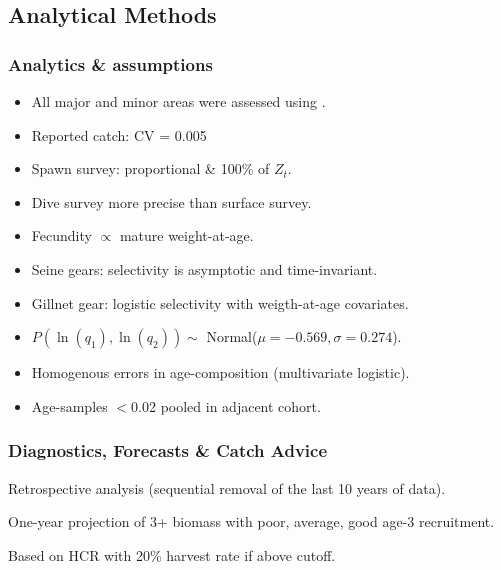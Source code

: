 \subsection{Analytical Methods} %
\label{sub:analytical_methods}
\begin{frame}[t]\frametitle{Analytics \& assumptions}
	\begin{itemize}
		\item<+-> All major and minor areas were assessed using  \iscam.
		\item<+-> Reported catch: CV = 0.005
		\item<+-> Spawn survey: proportional \& 100\% of $Z_t$.
		\item<+-> Dive survey more precise than surface survey.
		\item<+-> Fecundity $\propto$ mature weight-at-age.
		\item<+-> Seine gears: selectivity is asymptotic and time-invariant. 
		\item<+-|alert@+> Gillnet gear: logistic selectivity with weigth-at-age covariates.
		\item<+-|alert@+> $P(\ln(q_1),\ln(q_2)) \sim $ Normal($\mu=-0.569,\sigma=0.274$).
		\item<+-> Homogenous errors in age-composition (multivariate logistic).
		\item<+-> Age-samples $<$0.02 pooled in adjacent cohort.
	\end{itemize}
\end{frame}

\begin{frame}[c]\frametitle{Diagnostics, Forecasts \& Catch Advice}
	\begin{description}
		\item<+->[Diagnostics] Retrospective analysis (sequential removal of the last 10 years of data).
		\item<+->[Forecasts] One-year projection of 3+ biomass with poor, average, good age-3 recruitment.
		\item<+->[Catch advice] Based on HCR with 20\% harvest rate if above cutoff.
	\end{description}
\end{frame}

